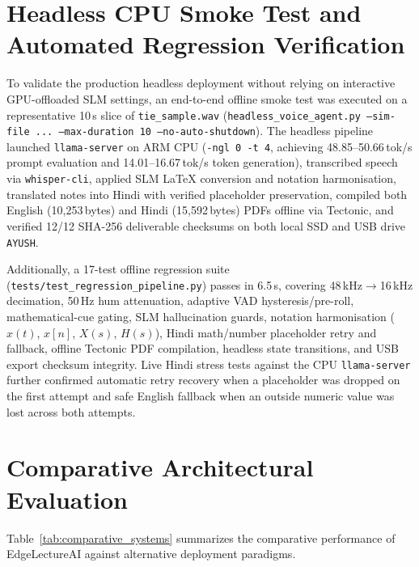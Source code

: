 \documentclass[11pt,a4paper,oneside]{report}
\begin{document}
\section{Headless CPU Smoke Test and Automated Regression Verification}
\label{sec:smoke_and_regression}
To validate the production headless deployment without relying on interactive GPU-offloaded SLM settings, an end-to-end offline smoke test was executed on a representative 10\,s slice of \texttt{tie\_sample.wav} (\texttt{headless\_voice\_agent.py --sim-file ... --max-duration 10 --no-auto-shutdown}). The headless pipeline launched \texttt{llama-server} on ARM CPU (\texttt{-ngl 0 -t 4}, achieving 48.85--50.66\,tok/s prompt evaluation and 14.01--16.67\,tok/s token generation), transcribed speech via \texttt{whisper-cli}, applied SLM LaTeX conversion and notation harmonisation, translated notes into Hindi with verified placeholder preservation, compiled both English (10,253\,bytes) and Hindi (15,592\,bytes) PDFs offline via Tectonic, and verified 12/12 SHA-256 deliverable checksums on both local SSD and USB drive \texttt{AYUSH}.

Additionally, a 17-test offline regression suite (\texttt{tests/test\_regression\_pipeline.py}) passes in 6.5\,s, covering 48\,kHz$\to$16\,kHz decimation, 50\,Hz hum attenuation, adaptive VAD hysteresis/pre-roll, mathematical-cue gating, SLM hallucination guards, notation harmonisation ($x(t)$, $x[n]$, $X(s)$, $H(s)$), Hindi math/number placeholder retry and fallback, offline Tectonic PDF compilation, headless state transitions, and USB export checksum integrity. Live Hindi stress tests against the CPU \texttt{llama-server} further confirmed automatic retry recovery when a placeholder was dropped on the first attempt and safe English fallback when an outside numeric value was lost across both attempts.

\section{Comparative Architectural Evaluation}
\label{sec:comparative_eval}
Table~\ref{tab:comparative_systems} summarizes the comparative performance of EdgeLectureAI against alternative deployment paradigms.
\end{document}
